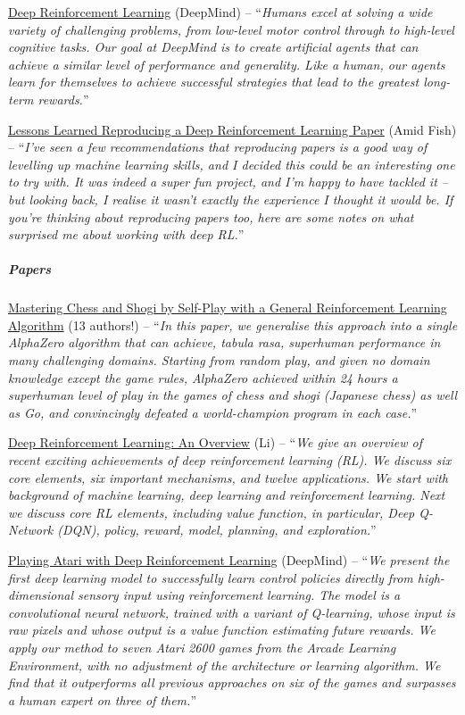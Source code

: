 \documentclass[a4paper, 11pt]{article}
\begin{document}
\href{https://deepmind.com/blog/deep-reinforcement-learning/}{Deep
Reinforcement Learning} (DeepMind) -- ``\emph{Humans excel at solving a
wide variety of challenging problems, from low-level motor control
through to high-level cognitive tasks. Our goal at DeepMind is to create
artificial agents that can achieve a similar level of performance and
generality. Like a human, our agents learn for themselves to achieve
successful strategies that lead to the greatest long-term rewards.}''

\href{http://amid.fish/reproducing-deep-rl}{Lessons Learned Reproducing
a Deep Reinforcement Learning Paper} (Amid Fish) -- ``\emph{I've seen a
few recommendations that reproducing papers is a good way of levelling
up machine learning skills, and I decided this could be an interesting
one to try with. It was indeed a super fun project, and I'm happy to
have tackled it -- but looking back, I realise it wasn't exactly the
experience I thought it would be. If you're thinking about reproducing
papers too, here are some notes on what surprised me about working with
deep RL.}''

\subparagraph{\textbf{Papers}}

\href{https://arxiv.org/abs/1712.01815}{Mastering Chess and Shogi by
Self-Play with a General Reinforcement Learning Algorithm} (13 authors!)
-- ``\emph{In this paper, we generalise this approach into a single
AlphaZero algorithm that can achieve, tabula rasa, superhuman
performance in many challenging domains. Starting from random play, and
given no domain knowledge except the game rules, AlphaZero achieved
within 24 hours a superhuman level of play in the games of chess and
shogi (Japanese chess) as well as Go, and convincingly defeated a
world-champion program in each case.}''

\href{https://arxiv.org/abs/1701.07274}{Deep Reinforcement Learning: An
Overview} (Li) -- ``\emph{We give an overview of recent exciting
achievements of deep reinforcement learning (RL). We discuss six core
elements, six important mechanisms, and twelve applications. We start
with background of machine learning, deep learning and reinforcement
learning. Next we discuss core RL elements, including value function, in
particular, Deep Q-Network (DQN), policy, reward, model, planning, and
exploration.}''

\href{http://www.cl.cam.ac.uk/~ey204/teaching/ACS/R244_2017_2018/papers/mnih_nips_2013.pdf}{Playing
Atari with Deep Reinforcement Learning} (DeepMind) -- ``\emph{We present
the first deep learning model to successfully learn control policies
directly from high-dimensional sensory input using reinforcement
learning. The model is a convolutional neural network, trained with a
variant of Q-learning, whose input is raw pixels and whose output is a
value function estimating future rewards. We apply our method to seven
Atari 2600 games from the Arcade Learning Environment, with no
adjustment of the architecture or learning algorithm. We find that it
outperforms all previous approaches on six of the games and surpasses a
human expert on three of them.}''
\end{document}

